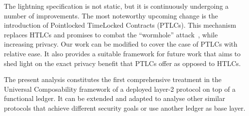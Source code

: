   The lightning specification is not static, but it is continuously
  undergoing a number of improvements. The most noteworthy upcoming change is
  the introduction of Pointlocked TimeLocked Contracts (PTLCs). This mechanism
  replaces HTLCs and promises to combat the ``wormhole''
  attack~\cite{DBLP:conf/ndss/MalavoltaMSKM19}, while increasing privacy. Our
  work can be modified to cover the case of PTLCs with relative ease. It also
  provides a suitable framework for future work that aims to shed light on the
  exact privacy benefit that PTLCs offer as opposed to HTLCs.

  The present analysis constitutes the first comprehensive treatment in
  the Universal Composability framework of a deployed layer-2 protocol on top of
  a functional ledger. It can be extended and adapted to analyse other similar
  protocols that achieve different security goals or use another ledger as base
  layer.

